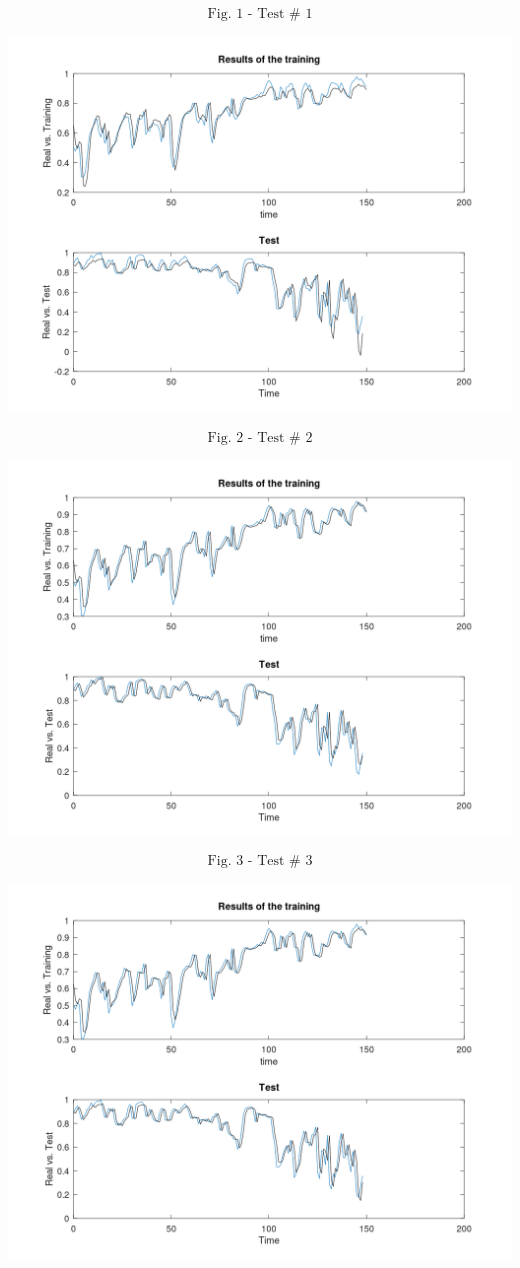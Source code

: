\documentclass[conference,final,]{IEEEtran}
\makeatletter
\def\maxwidth{\ifdim\Gin@nat@width>\linewidth\linewidth
\else\Gin@nat@width\fi}
\let\Oldincludegraphics\includegraphics
\renewcommand{\includegraphics}[1]{\Oldincludegraphics[width=\maxwidth]{#1}}
\makeatother
\begin{document}
\[
\text{Fig. 1 - Test # 1}
\]

\includegraphics{../Figures/fig2.png}

\[
\text{Fig. 2 - Test # 2}
\]

\includegraphics{../Figures/fig3.png}

\[
\text{Fig. 3 - Test # 3}
\]

\includegraphics{../Figures/fig4.png}
\end{document}
